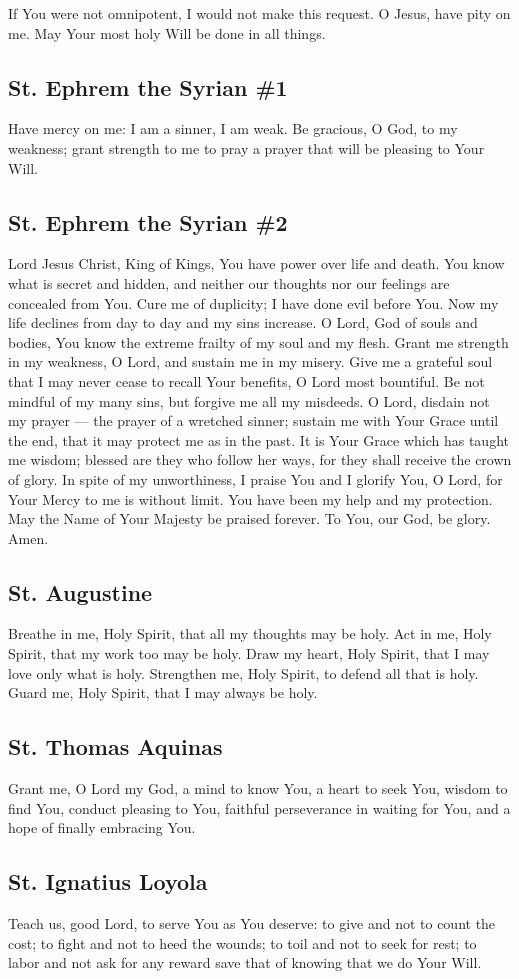 \documentclass[12pt]{article}
\newcommand{\prayertitle}[1]{\subsection{#1}}
\begin{document}
If You were not omnipotent, I would not make this request.
O Jesus, have pity on me.
May Your most holy Will be done in all things.

\prayertitle{St. Ephrem the Syrian \#1}
Have mercy on me:
I am a sinner, I am weak.
Be gracious, O God, to my weakness;
grant strength to me to pray a prayer that will be pleasing to Your Will.

\prayertitle{St. Ephrem the Syrian \#2}
\label{prayer:StEphrem2}
Lord Jesus Christ, King of Kings, You have power over life and death.
You know what is secret and hidden, and neither our thoughts nor our feelings are concealed from You.
Cure me of duplicity;
I have done evil before You.
Now my life declines from day to day and my sins increase.
O Lord, God of souls and bodies, You know the extreme frailty of
my soul and my flesh.
Grant me strength in my weakness, O Lord, and sustain me in my misery.
Give me a grateful soul that I may never cease to recall Your benefits, O Lord most bountiful.
Be not mindful of my many sins, but forgive me all my misdeeds.
O Lord, disdain not my prayer --- the prayer of a wretched sinner;
sustain me with Your Grace until the end, that it may protect me as in the past.
It is Your Grace which has taught me wisdom;
blessed are they who follow her ways, for they shall receive the crown of glory.
In spite of my unworthiness, I praise You and I glorify You, O Lord, for Your Mercy to me is without limit.
You have been my help and my protection.
May the Name of Your Majesty be praised forever. 
To You, our God, be glory.
Amen.

\prayertitle{St. Augustine}
Breathe in me, Holy Spirit, that all my thoughts may be holy.
Act in me, Holy Spirit, that my work too may be holy.
Draw my heart, Holy Spirit, that I may love only what is holy.
Strengthen me, Holy Spirit, to defend all that is holy.
Guard me, Holy Spirit, that I may always be holy.

\prayertitle{St. Thomas Aquinas}
Grant me, O Lord my God,
a mind to know You,
a heart to seek You,
wisdom to find You,
conduct pleasing to You,
faithful perseverance in waiting for You,
and a hope of finally embracing You.

\prayertitle{St. Ignatius Loyola}
Teach us, good Lord, to serve You as You deserve:
to give and not to count the cost;
to fight and not to heed the wounds;
to toil and not to seek for rest;
to labor and not ask for any reward save that of knowing that we do Your Will.
\end{document}
